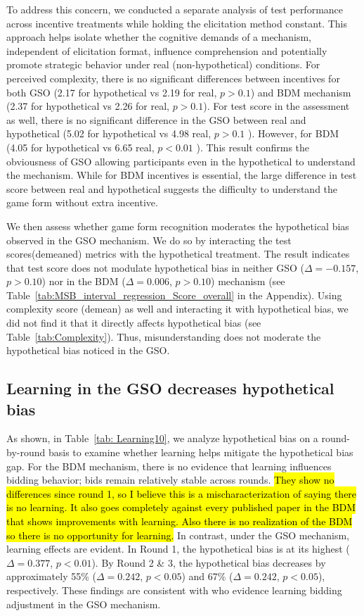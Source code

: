 \documentclass[12pt]{article}
\begin{document}
To address this concern, we conducted a separate analysis of test performance across incentive treatments while holding the elicitation method constant. This approach helps isolate whether the cognitive demands of a mechanism, independent of elicitation format, influence comprehension and potentially promote strategic behavior under real (non-hypothetical) conditions. For perceived complexity, there is no significant differences between incentives for both GSO (2.17 for hypothetical vs 2.19 for real, \(p > 0.1\)) and BDM mechanism (2.37 for hypothetical vs 2.26 for real, \(p > 0.1\)). For test score in the assessment as well, there is no significant difference in the GSO between real and hypothetical (5.02 for hypothetical vs 4.98 real, \(p > 0.1\) ). However,  for BDM (4.05 for hypothetical vs 6.65 real, \(p < 0.01\) ). This result confirms the obviousness of GSO allowing participants even in the hypothetical to understand the mechanism. While for BDM incentives is essential, the large difference in test score between real and hypothetical suggests the difficulty to understand the game form without extra incentive.  

We then assess whether game form recognition moderates the hypothetical bias observed in the GSO mechanism. We do so by interacting the test scores(demeaned) metrics with the hypothetical treatment. 
The result indicates that test score does not modulate hypothetical bias in neither GSO (\(\Delta = -0.157\), \(p > 0.10\))  nor in the BDM (\(\Delta = 0.006\), \(p > 0.10\)) mechanism (see Table~\ref{tab:MSB_interval_regression_Score_overall} in the Appendix). Using complexity score (demean) as well and interacting it with hypothetical bias, we did not find it that it directly affects hypothetical bias (see Table~\ref{tab:Complexity}). Thus, misunderstanding does not moderate the hypothetical bias noticed in the GSO. 




\subsection{Learning in the GSO decreases hypothetical bias}
\label{Sec: learning}
As shown, in Table~\ref{tab: Learning10}, we analyze hypothetical bias on a round-by-round basis to examine whether learning helps mitigate the hypothetical bias gap. For the BDM mechanism, there is no evidence that learning influences bidding behavior; bids remain relatively stable across rounds. \hl{They show no differences since round 1, so I believe this is a mischaracterization of saying there is no learning. It also goes completely against every published paper in the BDM that shows improvements with learning. Also there is no realization of the BDM so there is no opportunity for learning.}
In contrast, under the GSO mechanism, learning effects are evident. In Round 1, the hypothetical bias is at its highest (\(\Delta = 0.377\), \(p < 0.01\)). By Round 2 \& 3, the hypothetical bias decreases by approximately 55\% (\(\Delta = 0.242\), \(p < 0.05\)) and 67\% (\(\Delta = 0.242\), \(p < 0.05\)), respectively. These findings are consistent with \citet{brown_is_2023} who evidence learning bidding adjustment in the GSO mechanism. 
\end{document}
